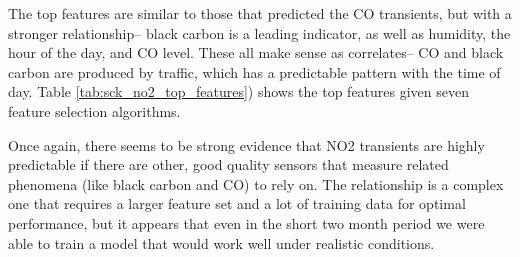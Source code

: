 The top features are similar to those that predicted the CO transients, but with a stronger relationship-- black carbon is a leading indicator, as well as humidity, the hour of the day, and CO level.  These all make sense as correlates-- CO and black carbon are produced by traffic, which has a predictable pattern with the time of day.  Table \ref{tab:sck_no2_top_features}) shows the top features given seven feature selection algorithms.

\begin{margintable}
\centering
\offinterlineskip
\hspace*{-5cm}\raisebox{-4cm}[0pt][0pt]{}\par
\hspace{.3cm}\par
\vspace{-.5cm}
\hspace*{1cm}\par
{}
\vspace{-.35cm}\raisebox{-1cm}
}
\label{tab:sck_no2_confusion}
\caption{Average SmartCitizen NO2 Confusion Matrix w/Shuffled K-Fold}
\end{margintable}

Once again, there seems to be strong evidence that NO2 transients are highly predictable if there are other, good quality sensors that measure related phenomena (like black carbon and CO) to rely on.  The relationship is a complex one that requires a larger feature set and a lot of training data for optimal performance, but it appears that even in the short two month period we were able to train a model that would work well under realistic conditions.

